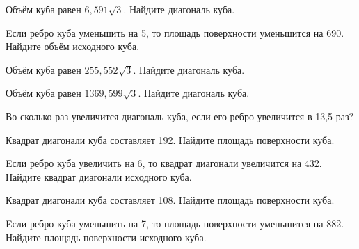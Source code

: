 \begin{taskBN}{84}
Объём куба равен $6,591\sqrt{3}$. Найдите диагональ куба.
\end{taskBN}

\begin{taskBN}{85}
Eсли ребро куба уменьшить на 5, то площадь поверхности уменьшится на 690. Найдите объём исходного куба.
\end{taskBN}

\begin{taskBN}{86}
Объём куба равен $255,552\sqrt{3}$. Найдите диагональ куба.
\end{taskBN}

\begin{taskBN}{87}
Объём куба равен $1369,599\sqrt{3}$. Найдите диагональ куба.
\end{taskBN}

\begin{taskBN}{88}
Во сколько раз увеличится диагональ куба, если его ребро увеличится в 13,5 раз?
\end{taskBN}

\begin{taskBN}{89}
Квадрат диагонали куба составляет 192. Найдите площадь поверхности куба.
\end{taskBN}

\begin{taskBN}{90}
Eсли ребро куба увеличить на 6, то квадрат диагонали увеличится на 432. Найдите квадрат диагонали исходного куба.
\end{taskBN}

\begin{taskBN}{91}
Квадрат диагонали куба составляет 108. Найдите площадь поверхности куба.
\end{taskBN}

\begin{taskBN}{92}
Eсли ребро куба уменьшить на 7, то площадь поверхности уменьшится на 882. Найдите площадь поверхности исходного куба.
\end{taskBN}

